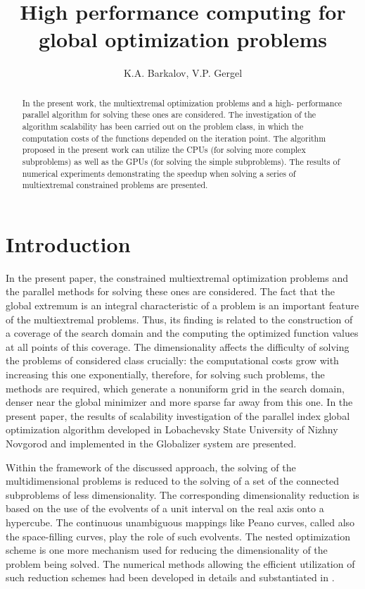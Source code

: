 \documentclass[a4paper]{jpconf}
\begin{document}
\title{High performance computing for global optimization problems}


\author{K.A. Barkalov, V.P. Gergel}

\address{National Research Lobachevsky State University of Nizhny Novgorod, Gagarin avenue 23, 
Nizhny Novgorod, Russia, 603950}



\begin{abstract}
In the present work, the multiextremal optimization problems and a high-
performance parallel algorithm for solving these ones are considered. The 
investigation of the algorithm scalability has been carried out on the 
problem class, in which the computation costs of the functions depended on 
the iteration point. The algorithm proposed in the present work can utilize 
the CPUs (for solving more complex subproblems) as well as the GPUs (for 
solving the simple subproblems). The results of numerical experiments 
demonstrating the speedup when solving a series of multiextremal constrained 
problems are presented.
\end{abstract}

\section{Introduction}
In the present paper, the constrained multiextremal optimization problems and 
the parallel methods for solving these ones are considered. The fact that the 
global extremum is an integral characteristic of a problem is an important 
feature of the multiextremal problems. Thus, its finding is related to the 
construction of a coverage of the search domain and the computing the 
optimized function values at all points of this coverage. The dimensionality 
affects the difficulty of solving the problems of considered class crucially: 
the computational costs grow with increasing this one exponentially, 
therefore, for solving such problems, the methods are required, which 
generate a nonuniform grid in the search domain, denser near the 
global minimizer and more sparse far away from this one. In the 
present paper, the results of scalability investigation of the parallel 
index global optimization algorithm developed in Lobachevsky State 
University of Nizhny Novgorod \cite{Strongin2000,Strongin2013} and implemented in the Globalizer 
system \cite{Globalizer} are presented.

Within the framework of the discussed approach, the solving of the 
multidimensional problems is reduced to the solving of a set of the connected 
subproblems of less dimensionality. The corresponding dimensionality 
reduction is based on the use of the evolvents of a unit interval on the real 
axis onto a hypercube. The continuous unambiguous mappings like Peano curves, 
called also the space-filling curves, play the role of such evolvents. 
The nested optimization scheme is one more mechanism used for reducing the 
dimensionality of the problem being solved. The numerical methods allowing 
the efficient utilization of such reduction schemes had been developed 
in details and substantiated in \cite{Strongin2000,Strongin2013}.
\end{document}
